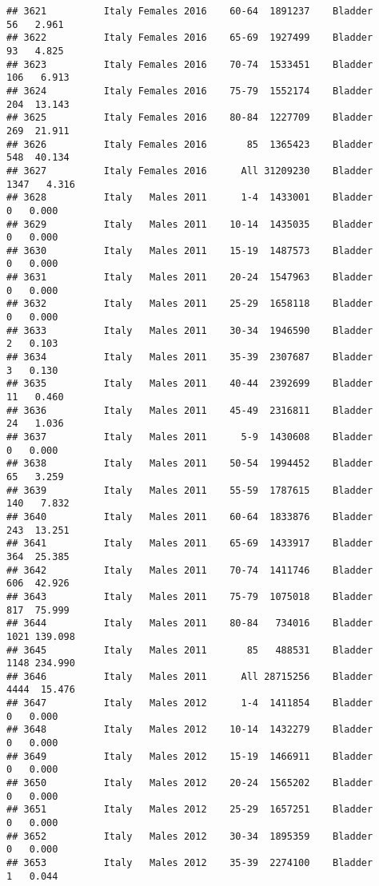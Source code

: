 \documentclass[
]{article}
\begin{document}
\begin{verbatim}
## 3621          Italy Females 2016    60-64  1891237    Bladder     56   2.961
## 3622          Italy Females 2016    65-69  1927499    Bladder     93   4.825
## 3623          Italy Females 2016    70-74  1533451    Bladder    106   6.913
## 3624          Italy Females 2016    75-79  1552174    Bladder    204  13.143
## 3625          Italy Females 2016    80-84  1227709    Bladder    269  21.911
## 3626          Italy Females 2016       85  1365423    Bladder    548  40.134
## 3627          Italy Females 2016      All 31209230    Bladder   1347   4.316
## 3628          Italy   Males 2011      1-4  1433001    Bladder      0   0.000
## 3629          Italy   Males 2011    10-14  1435035    Bladder      0   0.000
## 3630          Italy   Males 2011    15-19  1487573    Bladder      0   0.000
## 3631          Italy   Males 2011    20-24  1547963    Bladder      0   0.000
## 3632          Italy   Males 2011    25-29  1658118    Bladder      0   0.000
## 3633          Italy   Males 2011    30-34  1946590    Bladder      2   0.103
## 3634          Italy   Males 2011    35-39  2307687    Bladder      3   0.130
## 3635          Italy   Males 2011    40-44  2392699    Bladder     11   0.460
## 3636          Italy   Males 2011    45-49  2316811    Bladder     24   1.036
## 3637          Italy   Males 2011      5-9  1430608    Bladder      0   0.000
## 3638          Italy   Males 2011    50-54  1994452    Bladder     65   3.259
## 3639          Italy   Males 2011    55-59  1787615    Bladder    140   7.832
## 3640          Italy   Males 2011    60-64  1833876    Bladder    243  13.251
## 3641          Italy   Males 2011    65-69  1433917    Bladder    364  25.385
## 3642          Italy   Males 2011    70-74  1411746    Bladder    606  42.926
## 3643          Italy   Males 2011    75-79  1075018    Bladder    817  75.999
## 3644          Italy   Males 2011    80-84   734016    Bladder   1021 139.098
## 3645          Italy   Males 2011       85   488531    Bladder   1148 234.990
## 3646          Italy   Males 2011      All 28715256    Bladder   4444  15.476
## 3647          Italy   Males 2012      1-4  1411854    Bladder      0   0.000
## 3648          Italy   Males 2012    10-14  1432279    Bladder      0   0.000
## 3649          Italy   Males 2012    15-19  1466911    Bladder      0   0.000
## 3650          Italy   Males 2012    20-24  1565202    Bladder      0   0.000
## 3651          Italy   Males 2012    25-29  1657251    Bladder      0   0.000
## 3652          Italy   Males 2012    30-34  1895359    Bladder      0   0.000
## 3653          Italy   Males 2012    35-39  2274100    Bladder      1   0.044

\end{verbatim}
\end{document}
